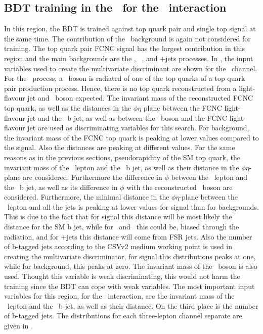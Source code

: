 \clearpage
\subsection{BDT training in the \TTSR\ for the \Zut\ interaction}
\label{sec:BDTTTSRZUT}
In this region, the BDT is trained against top quark pair and single top signal at the same time. The contribution of the \NPL\ background is again not considered for training. The top quark pair FCNC signal has the largest contribution in this region and the main backgrounds are the \ttZ, \SM\ \tZq, and \WZ+jets processes. In , the input variables used to create the multivariate discriminant are shown for the \mumumu\ channel. For the \ttZ\ process, a \PZ\ boson is radiated of one of the top quarks of a top quark pair production process. Hence, there is no top quark reconstructed from a light-flavour jet and \PZ\ boson expected. The invariant mass of the reconstructed FCNC top quark, as well as the distances in the $\phi\eta$ plane between the FCNC light-flavour jet and the \SM\ b jet, as well as between the \PZ\ boson and the FCNC light-flavour jet are used as discriminating variables for this search. For background, the invariant mass of the FCNC top quark is peaking at lower values compared to the signal. Also the distances are peaking at different values. For the same reasons as in the previous sections, pseudorapidity of the SM top quark,  the invariant mass of the \PW\ lepton and the \SM\ b jet, as well as their distance in the $\phi\eta$-plane are considered. Furthermore the difference in $\phi$ between the \PW\ lepton and the \SM\ b jet, as well as its difference in $\phi$ with the reconstructed \PZ\ boson are considered. Furthermore, the minimal distance in the $\phi\eta$-plane between the \PW\ lepton and all the jets is peaking at lower values for signal than for backgrounds. This is due to the fact that for signal this distance will be most likely the distance for the SM b  jet, while for \ttZ\ and \tZq\ this could be, biased through the radiation, and for \WZ+jets this distance will come from FSR jets. Also the number of b-tagged jets according to the CSVv2 medium working point is used in creating the multivariate discriminator, for signal this distributions peaks at one, while for background, this peaks at zero. The invariant mass of the \PZ\ boson is also used. Thought this variable is weak discriminating, this would not harm the training since the BDT can cope with weak variables.  The most important input variables for this region, for the \Zut\ interaction, are the invariant mass of the \PW\ lepton and the \SM\ b jet, as well as their distance. On the third place is the number of b-tagged jets. The distributions for each three-lepton channel separate are given in .
